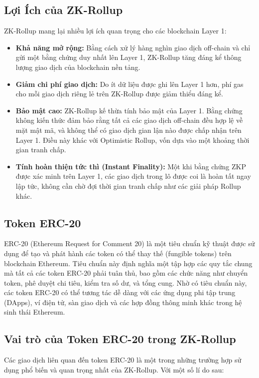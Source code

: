 \subsection{Lợi Ích của ZK-Rollup}
ZK-Rollup mang lại nhiều lợi ích quan trọng cho các blockchain Layer 1:

\begin{itemize}
    \item \textbf{Khả năng mở rộng:} Bằng cách xử lý hàng nghìn giao dịch off-chain và chỉ gửi một bằng chứng duy nhất lên Layer 1, ZK-Rollup tăng đáng kể thông lượng giao dịch của blockchain nền tảng.

    \item \textbf{Giảm chi phí giao dịch:} Do ít dữ liệu được ghi lên Layer 1 hơn, phí gas cho mỗi giao dịch riêng lẻ trên ZK-Rollup được giảm thiểu đáng kể.

    \item \textbf{Bảo mật cao:} ZK-Rollup kế thừa tính bảo mật của Layer 1. Bằng chứng không kiến thức đảm bảo rằng tất cả các giao dịch off-chain đều hợp lệ về mặt mật mã, và không thể có giao dịch gian lận nào được chấp nhận trên Layer 1. Điều này khác với Optimistic Rollup, vốn dựa vào một khoảng thời gian tranh chấp.

    \item \textbf{Tính hoàn thiện tức thì (Instant Finality):} Một khi bằng chứng ZKP được xác minh trên Layer 1, các giao dịch trong lô được coi là hoàn tất ngay lập tức, không cần chờ đợi thời gian tranh chấp như các giải pháp Rollup khác.
\end{itemize}

\subsection{Token ERC-20}
ERC-20 (Ethereum Request for Comment 20) \cite{erc20} là một tiêu chuẩn kỹ thuật được sử dụng để tạo và phát hành các token có thể thay thế (fungible tokens) trên blockchain Ethereum. Tiêu chuẩn này định nghĩa một tập hợp các quy tắc chung mà tất cả các token ERC-20 phải tuân thủ, bao gồm các chức năng như chuyển token, phê duyệt chi tiêu, kiểm tra số dư, và tổng cung. Nhờ có tiêu chuẩn này, các token ERC-20 có thể tương tác dễ dàng với các ứng dụng phi tập trung (DApps), ví điện tử, sàn giao dịch và các hợp đồng thông minh khác trong hệ sinh thái Ethereum.

\subsection{Vai trò của Token ERC-20 trong ZK-Rollup}
Các giao dịch liên quan đến token ERC-20 là một trong những trường hợp sử dụng phổ biến và quan trọng nhất của ZK-Rollup. Với một số lí do sau:

